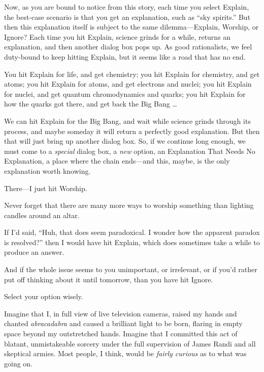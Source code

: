 {
 Now, as you are bound to notice from this story, each time you
select Explain, the best-case scenario is that you get an explanation,
such as ``sky spirits.'' But then
this explanation itself is subject to the same dilemma---Explain,
Worship, or Ignore? Each time you hit Explain, science grinds for a
while, returns an explanation, and then another dialog box pops up. As
good rationalists, we feel duty-bound to keep hitting Explain, but it
seems like a road that has no end.}

{
 You hit Explain for life, and get chemistry; you hit Explain for
chemistry, and get atoms; you hit Explain for atoms, and get electrons
and nuclei; you hit Explain for nuclei, and get quantum chromodynamics
and quarks; you hit Explain for how the quarks got there, and get back
the Big Bang \ldots}

{
 We can hit Explain for the Big Bang, and wait while science grinds
through its process, and maybe someday it will return a perfectly good
explanation. But then that will just bring up another dialog box. So,
if we continue long enough, we must come to a \textit{special} dialog
box, a \textit{new} option, an Explanation That Needs No Explanation, a
place where the chain ends---and this, maybe, is the only explanation
worth knowing.}

{
 There---I just hit Worship.}

{
 Never forget that there are many more ways to worship something
than lighting candles around an altar.}

{
 If I'd said, ``Huh, that does
seem paradoxical. I wonder how the apparent paradox is
resolved?'' then I would have hit Explain, which does
sometimes take a while to produce an answer.}

{
 And if the whole issue seems to you unimportant, or irrelevant, or
if you'd rather put off thinking about it until
tomorrow, than you have hit Ignore.}

{
 Select your option wisely.}

\myendsectiontext


{
 Imagine that I, in full view of live television cameras, raised my
hands and chanted \textit{abracadabra} and caused a brilliant light to
be born, flaring in empty space beyond my outstretched hands. Imagine
that I committed this act of blatant, unmistakeable sorcery under the
full supervision of James Randi and all skeptical armies. Most people,
I think, would be \textit{fairly curious} as to what was going on. }

